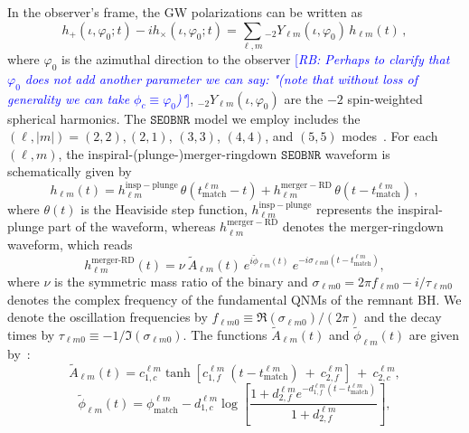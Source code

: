 \documentclass[twocolumn,prd,aps,superscriptaddress,preprintnumbers,tightenlines,showpacs,nofootinbib,eqsecnum,amsfonts,amsmath]{revtex4-1}
\newcommand{\rb}[1]{\textcolor{blue}{[\textit{RB: #1}]}}
\newcommand{\SEOB}{\texttt{SEOBNR}}
\begin{document}
In the observer's frame, the GW polarizations can be written as 
%
\begin{equation}
h_+(\iota,\varphi_0;t ) - i h_\times(\iota,\varphi_0;t) = \sum_{\ell, m} {}_{-\!2}Y_{\ell m}(\iota,\varphi_0)\, h_{\ell m}(t)\,,
\end{equation}
%
where $\varphi_0$ is the azimuthal direction to the observer \rb{Perhaps to clarify that $\varphi_0$ does not add another parameter we can say: "(note that without loss of generality we can take $\phi_c\equiv\varphi_0$)"}, ${}_{-\!2}Y_{\ell m}(\iota,\varphi_0)$ are the $-2$ spin-weighted spherical harmonics. The $\SEOB$ model we employ includes the $(\ell, |m|)=(2,2),(2,1)$, $(3,3)$, $(4,4)$, and $(5,5)$ modes~\cite{Cotesta:2018fcv}. For each $(\ell, m)$, the inspiral-(plunge-)merger-ringdown $\SEOB$ waveform is schematically given by
%
\begin{equation}
h_{\ell m}(t) = h_{\ell m}^\mathrm{insp-plunge}\, \theta(t_\mathrm{match}^{\ell m} - t) + h_{\ell m}^\mathrm{merger-RD}\,\theta(t-t_\mathrm{match}^{\ell m})\,,
\end{equation}
where $\theta(t)$ is the Heaviside step function, $h_{\ell m}^\mathrm{insp-plunge}$ represents the inspiral-plunge part of the waveform, whereas $h_{\ell m}^\mathrm{merger-RD}$ denotes the merger-ringdown waveform, which reads~\citep{Bohe:2016gbl,Cotesta:2018fcv}
%
\begin{equation}
\label{RD}
h_{\ell m}^{\textrm{merger-RD}}(t) = \nu \ \tilde{A}_{\ell m}(t)\ e^{i \tilde{\phi}_{\ell m}(t)} \ e^{-i \sigma_{\ell m 0}(t-t_{\textrm{match}}^{\ell m})},
\end{equation}
%
where $\nu$ is the symmetric mass ratio of the binary and $\sigma_{\ell m0} = 2\pi f_{\ell m 0} -i/\tau_{\ell m 0}$ denotes the complex frequency of the fundamental QNMs of the remnant BH. We denote the oscillation frequencies by $f_{\ell m  0}\equiv \Re(\sigma_{\ell m0})/(2\pi)$ and the decay times by $\tau_{\ell m 0}\equiv -1/\Im(\sigma_{\ell m0}) $. 
The functions $\tilde{A}_{\ell m}(t)$ and $\tilde{\phi}_{\ell m}(t)$ are given by~\cite{Bohe:2016gbl,Cotesta:2018fcv}:
%
\begin{equation}
\label{eq:ansatz_amp}
\tilde{A}_{\ell m}(t) = c_{1,c}^{\ell m} \tanh[c_{1,f}^{\ell m}\ (t-t_{\textrm{match}}^{\ell m}) \ +\ c_{2,f}^{\ell m}] \ + \ c_{2,c}^{\ell m},
\end{equation}
%
\begin{equation}
\label{eq:ansatz_phase}
\tilde{\phi}_{\ell m}(t) = \phi_{\textrm{match}}^{\ell m} - d_{1,c}^{\ell m} \log\left[\frac{1+d_{2,f}^{\ell m} e^{-d_{1,f}^{\ell m}(t-t_{\textrm{match}}^{\ell m})}}{1+d_{2,f}^{\ell m}}\right],
\end{equation}
\end{document}
